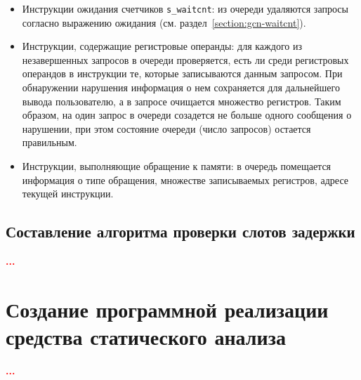 \documentclass[a4paper,14pt]{extarticle}
\newcommand{\todo}[1]{\textbf{\textcolor{red}{#1}}}
\newenvironment{ul}{\begin{itemize}[noitemsep,topsep=0em]}{\end{itemize}\vspace{20pt}}
\begin{document}
\begin{ul}
\item Инструкции ожидания счетчиков \texttt{s\_waitcnt}: из очереди удаляются
  запросы согласно выражению ожидания (см. раздел~\ref{section:gcn-waitcnt}).
\item Инструкции, содержащие регистровые операнды: для каждого из незавершенных запросов
  в очереди проверяется, есть ли среди регистровых операндов в инструкции те,
  которые записываются данным запросом. При обнаружении нарушения информация о нем
  сохраняется для дальнейшего вывода пользователю, а в запросе очищается множество
  регистров. Таким образом, на один запрос в очереди созадется не больше одного сообщения
  о нарушении, при этом состояние очереди (число запросов) остается правильным.
\item Инструкции, выполняющие обращение к памяти: в очередь помещается информация о
  типе обращения, множестве записываемых регистров, адресе текущей инструкции.
\end{ul}

\subsection{Составление алгоритма проверки слотов задержки}

\todo{...}

\section{Создание программной реализации средства статического анализа}

\todo{...}

\newpage
{}
{}
\printbibliography[title={СПИСОК ИСТОЧНИКОВ}]
\end{document}
